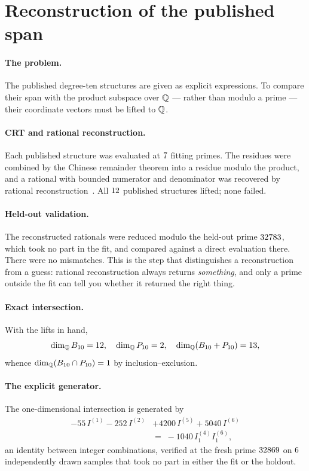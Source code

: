 \section{Reconstruction of the published span}
\label{app:b10}

\paragraph{The problem.}
The published degree-ten structures are given as explicit expressions. To compare
their span with the product subspace over $\mathbb{Q}$ --- rather than modulo a prime ---
their coordinate vectors must be lifted to $\mathbb{Q}$.

\paragraph{CRT and rational reconstruction.}
Each published structure was evaluated at $7$ fitting primes. The
residues were combined by the Chinese remainder theorem into a residue modulo the
product, and a rational with bounded numerator and denominator was recovered by
rational reconstruction~\cite{Wang:1982}. All $12$ published structures
lifted; none failed.

\paragraph{Held-out validation.}
The reconstructed rationals were reduced modulo the held-out prime
$32783$, which took no part in the fit, and compared against a direct
evaluation there. There were no mismatches. This is the step that distinguishes a
reconstruction from a guess: rational reconstruction always returns
\emph{something}, and only a prime outside the fit can tell you whether it
returned the right thing.

\paragraph{Exact intersection.}
With the lifts in hand,
\begin{equation}
\dim_{\mathbb{Q}} B_{10} = 12,\quad
\dim_{\mathbb{Q}} P_{10} = 2,\quad
\dim_{\mathbb{Q}}(B_{10} + P_{10}) = 13,
\end{equation}
whence $\dim_{\mathbb{Q}}(B_{10} \cap P_{10}) = 1$ by inclusion--exclusion.

\paragraph{The explicit generator.}
The one-dimensional intersection is generated by
\begin{equation}
\begin{split}
-55\,I^{(1)} - 252\,I^{(2)}& + 4200\,I^{(5)} + 5040\,I^{(6)} \\
 &=\; -1040\,I^{(4)}_1 I^{(6)}_1,
\end{split}
\end{equation}
an identity between integer combinations, verified at the fresh prime
$32869$ on $6$ independently drawn samples that took no
part in either the fit or the holdout.

